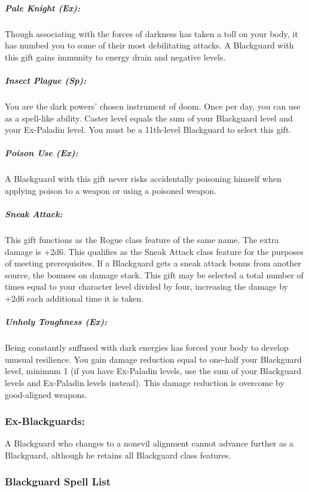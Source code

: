 \subparagraph{Pale Knight (Ex):}
Though associating with the forces of darkness has taken a toll on your body, it has numbed you to some of their most debilitating attacks. A Blackguard with this gift gains immunity to energy drain and negative levels. 

\subparagraph{Insect Plague (Sp):}
You are the dark powers' chosen instrument of doom. Once per day, you can use  as a spell-like ability. Caster level equals the sum of your Blackguard level and your Ex-Paladin level.
You must be a 11th-level Blackguard to select this gift.

\subparagraph{Poison Use (Ex):}
A Blackguard with this gift never risks accidentally poisoning himself when applying poison to a weapon or using a poisoned weapon.

\subparagraph{Sneak Attack:}
This gift functions as the Rogue class feature of the same name. 
The extra damage is +2d6. 
This qualifies as the Sneak Attack class feature for the purposes of meeting prerequisites.
If a Blackguard gets a sneak attack bonus from another source, the bonuses on damage stack.
This gift may be selected a total number of times equal to your character level divided by four, increasing the damage by +2d6 each additional time it is taken.

\subparagraph{Unholy Toughness (Ex):}
Being constantly suffused with dark energies has forced your body to develop unusual resilience. You gain damage reduction equal to one-half your Blackguard level, minimum 1 (if you have Ex-Paladin levels, use the sum of your Blackguard levels and Ex-Paladin levels instead). This damage reduction is overcome by good-aligned weapons.

\subsubsection{Ex-Blackguards:}
A Blackguard who changes to a nonevil alignment cannot advance further as a Blackguard, although he retains all Blackguard class features.

\subsubsection{Blackguard Spell List}
\label{sec:BlackguardSpellList}
